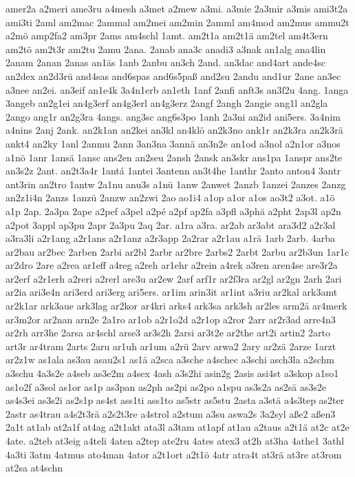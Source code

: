 {amer2a
a2meri
ame3ru
a4mesh
a3met
a2mew
a3mi.
a3mie
2a3mir
a3mis
ami3t2a
ami3ti
2aml
am2mac
2ammal
am2mei
am2min
2amml
am4mod
am2mus
ammu2t
a2mö
amp2fa2
am3pr
2ams
am4schl
1amt.
am2t1a
am2t1ä
am2tel
am4t3ern
am2tö
am2t3r
am2tu
2amu
2ana.
2anab
ana3c
anadi3
a3nak
an1alg
ana4lin
2anam
2anan
2anas
an1äs
1anb
2anbu
an3ch
2and.
an3dac
and4art
ande4sc
an2dex
an2d3rü
and4sas
and6spas
and6s5paß
and2su
2andu
and1ur
2ane
an3ec
a3nee
an2ei.
an3eif
an1e4k
3a4n1erb
an1eth
1anf
2anfi
anft3s
an3f2u
4ang.
1anga
3angeb
an2g1ei
an4g3erf
an4g3erl
an4g3erz
2angf
2angh
2angie
ang1l
an2gla
2ango
ang1r
an2g3ra
4angs.
ang3sc
ang6s3po
1anh
2a3ni
an2id
ani5ers.
3a4nim
a4nins
2anj
2ank.
an2k1an
an2kei
an3kl
an4klö
an2k3no
ank1r
an2k3ra
an2k3rä
ankt4
an2ky
1anl
2anmu
2ann
3an3na
3annä
an3n2e
an1od
a3nol
a2n1or
a3nos
a1nö
1anr
1ansä
1ansc
ans2en
an2seu
2ansh
2ansk
an3skr
ans1pa
1anspr
ans2te
an3s2z
2ant.
an2t3a4r
1antá
1antei
3antenn
an3t4he
1anthr
2anto
anton4
3antr
ant3rin
an2tro
1antw
2a1nu
anu3s
a1nü
1anw
2anwet
2anzb
1anzei
2anzes
2anzg
an2z1i4n
2anzs
1anzü
2anzw
an2zwi
2ao
ao1i4
a1op
a1or
a1os
ao3t2
a3ot.
a1ö
a1p
2ap.
2a3pa
2ape
a2pef
a3pel
a2pé
a2pf
ap2fa
a3pfl
a3phä
a2pht
2ap3l
ap2n
a2pot
3appl
ap3pu
2apr
2a3pu
2aq
2ar.
a1ra
a3ra.
ar2ab
ar3abt
ara3d2
a2r3al
a3ra3li
a2r1ang
a2r1ans
a2r1anz
a2r3app
2a2rar
a2r1au
a1rä
1arb
2arb.
4arba
ar2bau
ar2bec
2arben
2arbi
ar2bl
2arbr
ar2bre
2arbs2
2arbt
2arbu
ar2b3un
1ar1c
ar2dro
2are
a2rea
ar1eff
a4reg
a2reh
ar1ehr
a2rein
a4rek
a3ren
aren4se
are3r2a
ar2erf
a2r1erh
a2reri
a2rerl
are3u
ar2ew
2arf
arf1r
ar2f3ra
ar2gl
ar2gn
2arh
2ari
ar2ia
ari3e4n
ari3erd
ari3erg
ari5ers.
ar1im
arin3it
ar1int
a3riu
ar2kal
ark3amt
ar2k1ar
ark3aue
ark3lag
ar2kor
ar4kri
arks4
ark3sa
ark3sh
ar2les
arm2ä
ar4merk
ar3m2or
ar2nan
arn2e
2a1ro
ar1ob
a2r1o2d
a2r1op
a2ror
2arr
ar2r3ad
arre4n3
ar2rh
arr3he
2arsa
ar4schl
arse3
ar3s2h
2arsi
ar3t2e
ar2the
art2i
artin2
2arto
art3r
ar4tram
2arts
2aru
ar1uh
ar1um
a2rü
2arv
arwa2
2ary
ar2zä
2arze
1arzt
ar2z1w
as1ala
as3au
asau2s1
as1ä
a2sca
a3sche
a4schec
a3schi
asch3la
a2schm
a3schu
4a3s2e
a4seb
as3e2m
a4sex
4ash
a3s2hi
asin2g
2asis
asi4st
a3skop
a1so1
as1o2f
a3sol
as1or
as1p
as3pan
as2ph
as2pi
as2po
a1spu
as3s2a
as2sä
as3s2e
as4s3ei
as3s2i
as2s1p
as4st
ass1ti
ass1to
as5str
as5stu
2asta
a3stä
a4s3tep
as2ter
2astr
as4trau
a4s2t3rä
a2s2t3re
a4strol
a2stum
a3su
aswa2s
3a2syl
aße2
aßen3
2a1t
at1ab
at2a1f
at4ag
a2t1akt
ata3l
a3tam
at1apf
at1au
a2taus
a2t1ä
at2c
at2e
4ate.
a2teb
at3eig
a4teli
4aten
a2tep
ate2ru
4ates
atex3
at2h
at3ha
4athe1
3athl
4a3ti
3atm
4atmus
ato4man
4ator
a2t1ort
a2t1ö
4atr
atra4t
at3rä
at3re
at3rom
at2sa
at4schn
}

